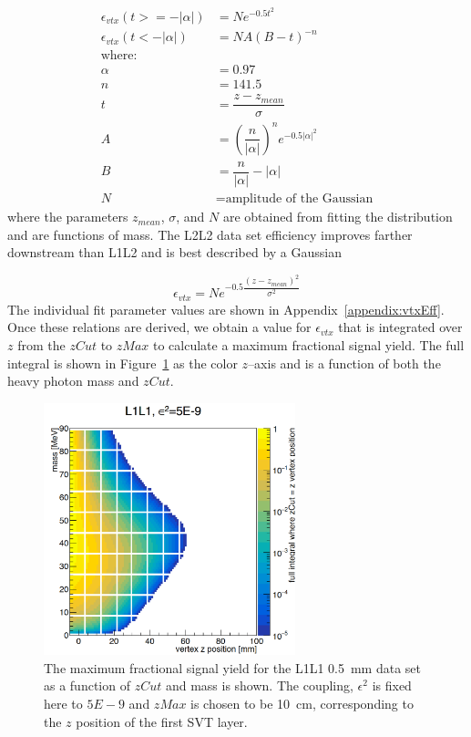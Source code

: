 \begin{equation}
\begin{split}
\label{eq:cbfunction}
\epsilon_{vtx}(t >= -| \alpha |) & = N e^{-0.5t^{2}}\\
\epsilon_{vtx}(t < -| \alpha |) & = N A(B-t)^{-n}\\
\textrm{where:}\\
\alpha & = 0.97\\
n & = 141.5\\
t & = \dfrac{z-z_{mean}}{\sigma}\\
A & = (\dfrac{n}{| \alpha |})^{n}e^{-0.5 |\alpha |^2}\\
B & = \dfrac{n}{| \alpha |}-|\alpha | \\
N & = \textrm{amplitude of the Gaussian}
\end{split}
\end{equation}
where the parameters $z_{mean}$, $\sigma$, and $N$ are obtained from fitting the distribution and are functions of mass. The L2L2 data set efficiency improves farther downstream than L1L2 and is best described by a Gaussian 

\begin{equation}
\label{eq:gausfunction}
\epsilon_{vtx} = Ne^{-0.5\dfrac{(z-z_{mean})^2}{\sigma^2}}
\end{equation}
The individual fit parameter values are shown in Appendix~\ref{appendix:vtxEff}.\\
\indent Once these relations are derived, we obtain a value for $\epsilon_{vtx}$ that is integrated over $z$ from the $zCut$ to $zMax$ to calculate a maximum fractional signal yield. The full integral is shown in Figure~\ref{fig:effIntegral} as the color $z$--axis and is a function of both the heavy photon mass and $zCut$.  

\begin{figure}[htb]
  \centering
      \includegraphics[width=0.65\textwidth]{pics/searching/integralEffL1L1.png}
  \caption[Integral as a function of mass and $zCut$ for L1L1]{The maximum fractional signal yield for the L1L1 0.5~mm data set as a function of $zCut$ and mass is shown. The coupling, $\epsilon^2$ is fixed here to $5E-9$ and $zMax$ is chosen to be 10~cm, corresponding to the $z$ position of the first SVT layer. }
  \label{fig:effIntegral}
\end{figure}

